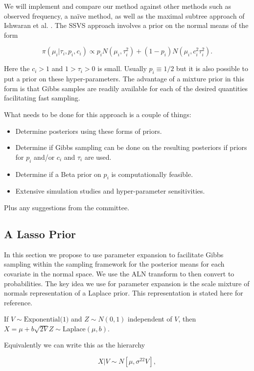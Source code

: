 We will implement and compare our method against other methods such as observed frequency, a na\"{i}ve method, as well as the maximal subtree approach of Ishwaran et al. \cite{ishwaran2010high, ishwaran2007variable}. The SSVS approach involves a prior on the normal means of the form 

\begin{equation}
\pi(\mu_i\vert \tau_i, p_i, c_i) \propto p_iN(\mu_i, \tau_i^2)+(1-p_i)N(\mu_i, c_i^2\tau_i^2).
\end{equation}

Here the $c_i >1$ and $1>\tau_i>0$ is small. Usually $p_i\equiv1/2$ but it is also possible to put a prior on these hyper-parameters. The advantage of a mixture prior in this form is that Gibbs samples are readily available for each of the desired quantities facilitating fast sampling.     

What needs to be done for this approach is a couple of things: 

\begin{itemize}
\item Determine posteriors using these forms of priors. 
\item Determine if Gibbs sampling can be done on the resulting posteriors if priors for $p_i$ and/or $c_i$ and $\tau_i$ are used. 
\item Determine if a Beta prior on $p_i$ is computationally feasible.  
\item Extensive simulation studies and hyper-parameter sensitivities.
\end{itemize}
Plus any suggestions from the committee.

\subsection{A Lasso Prior}
In this section we propose to use parameter expansion to facilitate Gibbs sampling within the sampling framework for the posterior means for each covariate in the normal space. We use the ALN transform to then convert to probabilities. 
The key idea we use for parameter expansion is the scale mixture of normals representation of a Laplace prior. This representation is stated here for reference.

If $V \sim \text{Exponential(1)}$ and $Z \sim N(0, 1)$ independent of $V$, then $X = \mu + b \sqrt{2 V}Z \sim \mathrm{Laplace}(\mu,b)$. 

Equivalently we can write this as the hierarchy

\begin{equation}\label{eqn:normal_cond_lhood_lasso}
X \vert V \sim N[\mu, \sigma^22V],
\end{equation}

